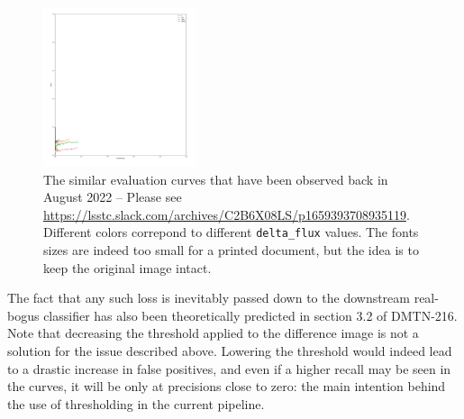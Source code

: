 \documentclass[DM,authoryear,toc]{lsstdoc}
\begin{document}
\clearpage
\begin{figure}[h]
  \centering
  \includegraphics[width=0.4\textwidth]{slack}
  \caption{The similar evaluation curves that have been observed back in August 2022 -- Please see \url{https://lsstc.slack.com/archives/C2B6X08LS/p1659393708935119}. Different colors correpond to different \texttt{delta\_flux} values. The fonts sizes are indeed too small for a printed document, but the idea is to keep the original image intact.}
  \label{fig:slack}
\end{figure}

The fact that any such loss is inevitably passed down to the downstream real-bogus classifier has also been theoretically predicted in section 3.2 of DMTN-216. Note that decreasing the threshold applied to the difference image is not a solution for the issue described above. Lowering the threshold would indeed lead to a drastic increase in false positives, and even if a higher recall may be seen in the curves, it will be only at precisions close to zero: the main intention behind the use of thresholding in the current pipeline.

\clearpage

\appendix
\end{document}
